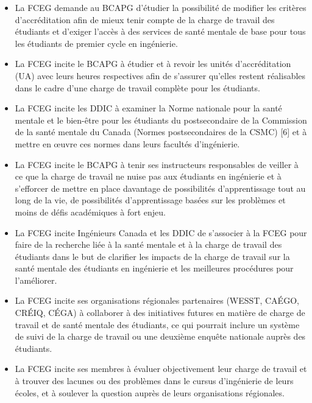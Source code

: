 \begin{itemize}
 \item La FCEG demande au BCAPG d'étudier la possibilité de modifier les critères d'accréditation afin de mieux tenir compte de la charge de travail des étudiants et d'exiger l'accès à des services de santé mentale de base pour tous les étudiants de premier cycle en ingénierie.
 \item La FCEG incite le BCAPG à étudier et à revoir les unités d'accréditation (UA) avec leurs heures respectives afin de s'assurer qu'elles restent réalisables dans le cadre d'une charge de travail complète pour les étudiants.
 \item La FCEG incite les DDIC à examiner la Norme nationale pour la santé mentale et le bien-être pour les étudiants du postsecondaire de la Commission de la santé mentale du Canada (Normes postsecondaires de la CSMC) [6] et à mettre en œuvre ces normes dans leurs facultés d'ingénierie.
 \item La FCEG incite le BCAPG à tenir ses instructeurs responsables de veiller à ce que la charge de travail ne nuise pas aux étudiants en ingénierie et à s'efforcer de mettre en place davantage de possibilités d'apprentissage tout au long de la vie, de possibilités d'apprentissage basées sur les problèmes et moins de défis académiques à fort enjeu.
 \item La FCEG incite Ingénieurs Canada et les DDIC de s'associer à la FCEG pour faire de la recherche liée à la santé mentale et à la charge de travail des étudiants dans le but de clarifier les impacts de la charge de travail sur la santé mentale des étudiants en ingénierie et les meilleures procédures pour l'améliorer.
 \item La FCEG incite ses organisations régionales partenaires (WESST, CAÉGO, CRÉIQ, CÉGA) à collaborer à des initiatives futures en matière de charge de travail et de santé mentale des étudiants, ce qui pourrait inclure un système de suivi de la charge de travail ou une deuxième enquête nationale auprès des étudiants.
 \item La FCEG incite ses membres à évaluer objectivement leur charge de travail et à trouver des lacunes ou des problèmes dans le cursus d'ingénierie de leurs écoles, et à soulever la question auprès de leurs organisations régionales.
\end{itemize}

